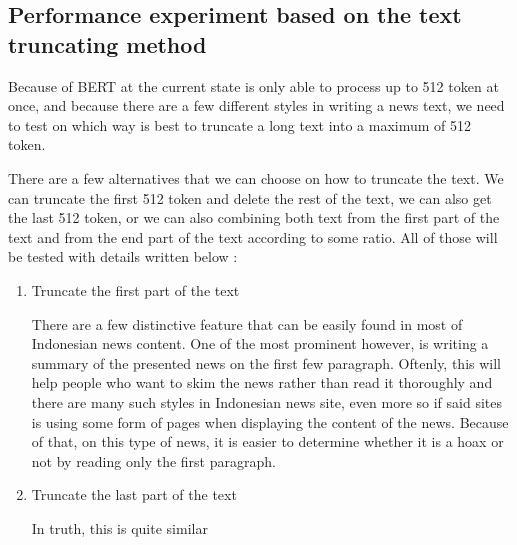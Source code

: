 \subsection{Performance experiment based on the text truncating method}

Because of BERT at the current state is only able to process up to 512 token at once, and because there are a few different styles in writing a news text, we need to test on which way is best to truncate a long text into a maximum of 512 token.

There are a few alternatives that we can choose on how to truncate the text. We can truncate the first 512 token and delete the rest of the text, we can also get the last 512 token, or we can also combining both text from the first part of the text and from the end part of the text according to some ratio. All of those will be tested with details written below :

\begin{enumerate}
  \item Truncate the first part of the text

        There are a few distinctive feature that can be easily found in most of Indonesian news content. One of the most prominent however, is writing a summary of the presented news on the first few paragraph. Oftenly, this will help people who want to skim the news rather than read it thoroughly and there are many such styles in Indonesian news site, even more so if said sites is using some form of pages when displaying the content of the news. Because of that, on this type of news, it is easier to determine whether it is a hoax or not by reading only the first paragraph.

  \item Truncate the last part of the text

        In truth, this is quite similar

\end{enumerate}